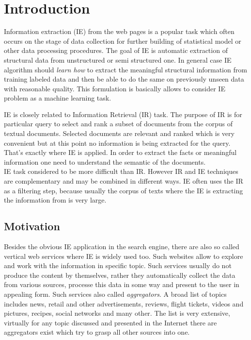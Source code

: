 \chapter{Introduction}
\label{chap:intro}
Information extraction (IE) from the web pages is a popular task which often occurs on the stage of data collection for further building of statistical model or other data processing procedures. The goal of IE is automatic extraction of structural data from unstructured or semi structured one. In general case IE algorithm should \textit{learn how} to extract the meaningful structural information from training labeled data and then be able to do the same on previously unseen data with reasonable quality. This formulation is basically allows to consider IE problem as a machine learning task.

IE is closely related to Information Retrieval (IR) task. The purpose of IR is for particular query to select and rank a subset of documents from the corpus of textual documents. Selected documents are relevant and ranked which is very convenient but at this point no information is being extracted for the query. That's exactly where IE is applied. In order to extract the facts or meaningful information one need to understand the semantic of the documents.\\

IE task considered to be more difficult than IR. However IR and IE techniques are complementary and may be combined in different ways. IE often uses the IR as a filtering step, because usually the corpus of texts where the IE is extracting the information from is very large.\\

\cite{IEstate}




\section{Motivation}
Besides the obvious IE application in the search engine, there are also so called vertical web services where IE is widely used too. Such websites allow to explore and work with the information in specific topic. Such services usually do not produce the content by themselves, rather they automatically collect the data from various sources, processe this data in some way and present to the user in appealing form. Such services also called \textit{aggregators}. A broad list of topics includes news, retail and other advertisements, reviews, flight tickets, videos and pictures, recipes, social networks and many other. The list is very extensive, virtually for any topic discussed and presented in the Internet there are aggregators exist which try to grasp all other sources into one. \\

